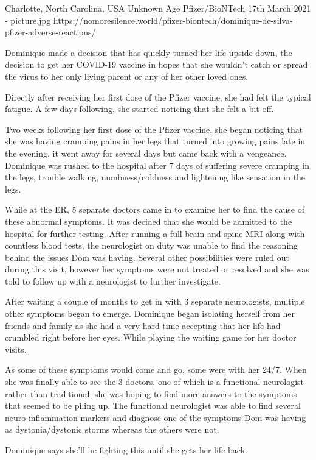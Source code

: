 {Charlotte, North Carolina, USA}
{Unknown Age}
{Pfizer/BioNTech}
{17th March 2021}
{-}
{picture.jpg}
{https://nomoresilence.world/pfizer-biontech/dominique-de-silva-pfizer-adverse-reactions/}
{


Dominique made a decision that has quickly turned her life upside down, the decision to get her COVID-19 vaccine in hopes that she wouldn’t catch or spread the virus to her only living parent or any of her other loved ones.

Directly after receiving her first dose of the Pfizer vaccine, she had felt the typical fatigue. A few days following, she started noticing that she felt a bit off.

Two weeks following her first dose of the Pfizer vaccine, she began noticing that she was having cramping pains in her legs that turned into growing pains late in the evening, it went away for several days but came back with a vengeance. Dominique was rushed to the hospital after 7 days of suffering severe cramping in the legs, trouble walking, numbness/coldness and lightening like sensation in the legs.

While at the ER, 5 separate doctors came in to examine her to find the cause of these abnormal symptoms. It was decided that she would be admitted to the hospital for further testing. After running a full brain and spine MRI along with countless blood tests, the neurologist on duty was unable to find the reasoning behind the issues Dom was having. Several other possibilities were ruled out during this visit, however her symptoms were not treated or resolved and she was told to follow up with a neurologist to further investigate.

After waiting a couple of months to get in with 3 separate neurologists, multiple other symptoms began to emerge. Dominique began isolating herself from her friends and family as she had a very hard time accepting that her life had crumbled right before her eyes. While playing the waiting game for her doctor visits.

As some of these symptoms would come and go, some were with her 24/7. When she was finally able to see the 3 doctors, one of which is a functional neurologist rather than traditional, she was hoping to find more answers to the symptoms that seemed to be piling up. The functional neurologist was able to find several neuro-inflammation markers and diagnose one of the symptoms Dom was having as dystonia/dystonic storms whereas the others were not.

Dominique says she’ll be fighting this until she gets her life back.
}
